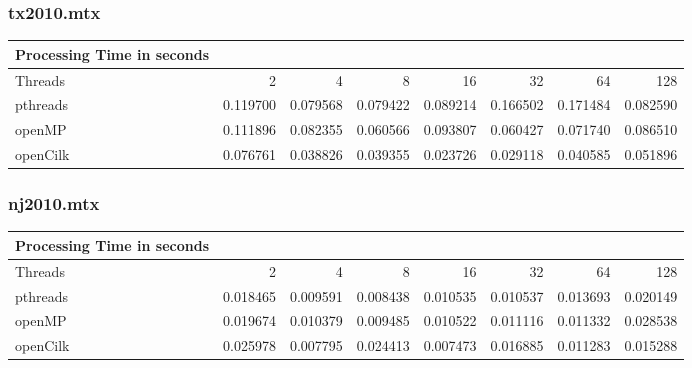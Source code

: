 \documentclass[11pt]{article}
\begin{document}
\subsubsection{tx2010.mtx}
\label{sec:org142e2d5}
\begin{center}
\begin{tabular}{lrrrrrrr}
\hline
Processing Time in seconds &  &  &  &  &  &  & \\[0pt]
\hline
Threads & 2 & 4 & 8 & 16 & 32 & 64 & 128\\[0pt]
\hline
pthreads & 0.119700 & 0.079568 & 0.079422 & 0.089214 & 0.166502 & 0.171484 & 0.082590\\[0pt]
openMP & 0.111896 & 0.082355 & 0.060566 & 0.093807 & 0.060427 & 0.071740 & 0.086510\\[0pt]
openCilk & 0.076761 & 0.038826 & 0.039355 & 0.023726 & 0.029118 & 0.040585 & 0.051896\\[0pt]
\hline
\end{tabular}
\end{center}
\subsubsection{nj2010.mtx}
\label{sec:orgebb8c94}
\begin{center}
\begin{tabular}{lrrrrrrr}
\hline
Processing Time in seconds &  &  &  &  &  &  & \\[0pt]
\hline
Threads & 2 & 4 & 8 & 16 & 32 & 64 & 128\\[0pt]
\hline
pthreads & 0.018465 & 0.009591 & 0.008438 & 0.010535 & 0.010537 & 0.013693 & 0.020149\\[0pt]
openMP & 0.019674 & 0.010379 & 0.009485 & 0.010522 & 0.011116 & 0.011332 & 0.028538\\[0pt]
openCilk & 0.025978 & 0.007795 & 0.024413 & 0.007473 & 0.016885 & 0.011283 & 0.015288\\[0pt]
\hline
\end{tabular}
\end{center}
\end{document}
